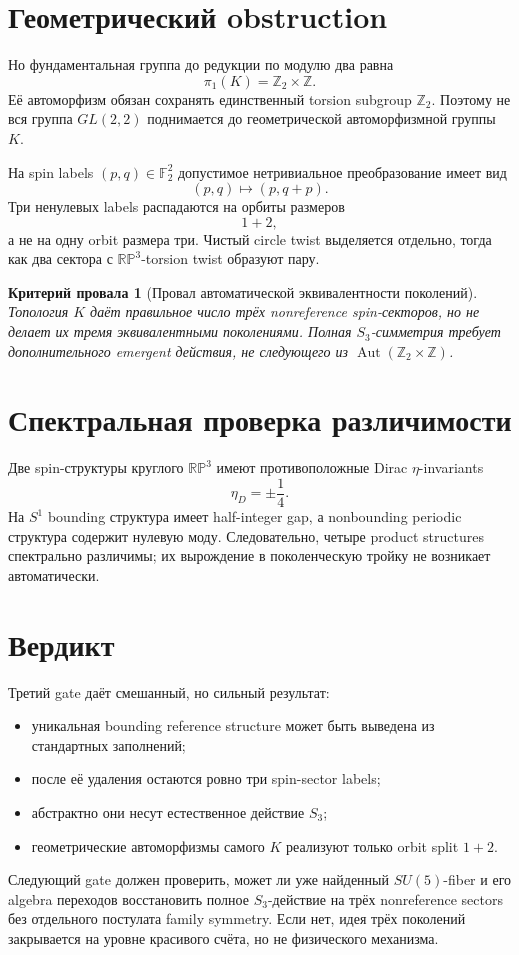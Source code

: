 \documentclass[12pt,a4paper]{article}
\newtheorem{nogocriterion}{Критерий провала}
\begin{document}
\section{Геометрический obstruction}

Но фундаментальная группа до редукции по модулю два равна
\[
\pi_1(K)=\mathbb Z_2\times\mathbb Z.
\]
Её автоморфизм обязан сохранять единственный torsion subgroup \(\mathbb Z_2\). Поэтому не вся группа \(GL(2,2)\) поднимается до геометрической автоморфизмной группы \(K\).

На spin labels \((p,q)\in\mathbb F_2^2\) допустимое нетривиальное преобразование имеет вид
\[
(p,q)\longmapsto(p,q+p).
\]
Три ненулевых labels распадаются на орбиты размеров
\[
1+2,
\]
а не на одну orbit размера три. Чистый circle twist выделяется отдельно, тогда как два сектора с \(\mathbb{RP}^3\)-torsion twist образуют пару.

\begin{nogocriterion}[Провал автоматической эквивалентности поколений]
Топология \(K\) даёт правильное число трёх nonreference spin-секторов, но не делает их тремя эквивалентными поколениями. Полная \(S_3\)-симметрия требует дополнительного emergent действия, не следующего из \(\operatorname{Aut}(\mathbb Z_2\times\mathbb Z)\).
\end{nogocriterion}

\section{Спектральная проверка различимости}

Две spin-структуры круглого \(\mathbb{RP}^3\) имеют противоположные Dirac \(\eta\)-invariants
\[
\eta_D=\pm\frac14.
\]
На \(S^1\) bounding структура имеет half-integer gap, а nonbounding periodic структура содержит нулевую моду. Следовательно, четыре product structures спектрально различимы; их вырождение в поколенческую тройку не возникает автоматически.

\section{Вердикт}

Третий gate даёт смешанный, но сильный результат:
\begin{itemize}
    \item уникальная bounding reference structure может быть выведена из стандартных заполнений;
    \item после её удаления остаются ровно три spin-sector labels;
    \item абстрактно они несут естественное действие \(S_3\);
    \item геометрические автоморфизмы самого \(K\) реализуют только orbit split \(1+2\).
\end{itemize}

Следующий gate должен проверить, может ли уже найденный \(SU(5)\)-fiber и его algebra переходов восстановить полное \(S_3\)-действие на трёх nonreference sectors без отдельного постулата family symmetry. Если нет, идея трёх поколений закрывается на уровне красивого счёта, но не физического механизма.
\end{document}
